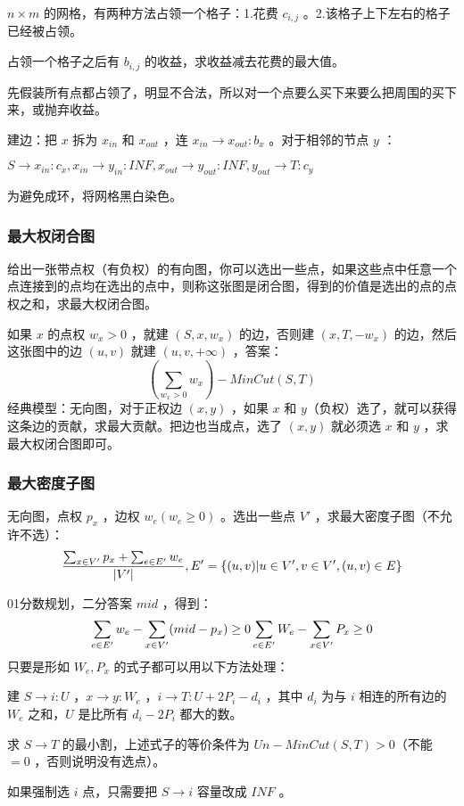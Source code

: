 $n\times m$ 的网格，有两种方法占领一个格子：1.花费 $c_{i,j}$ 。2.该格子上下左右的格子已经被占领。

占领一个格子之后有 $b_{i,j}$ 的收益，求收益减去花费的最大值。

先假装所有点都占领了，明显不合法，所以对一个点要么买下来要么把周围的买下来，或抛弃收益。

建边：把 $x$ 拆为 $x_{in}$ 和 $x_{out}$ ，连 $x_{in}\to x_{out}:b_x$ 。对于相邻的节点 $y$ ：

$S\to x_{in}:c_x,x_{in}\to y_{in}:INF,x_{out}\to y_{out}:INF,y_{out}\to T:c_y$

为避免成环，将网格黑白染色。

\subsubsection{最大权闭合图}

给出一张带点权（有负权）的有向图，你可以选出一些点，如果这些点中任意一个点连接到的点均在选出的点中，则称这张图是闭合图，得到的价值是选出的点的点权之和，求最大权闭合图。

如果 $x$ 的点权 $w_x>0$ ，就建 $(S,x,w_x)$ 的边，否则建 $(x,T,-w_x)$ 的边，然后这张图中的边 $(u,v)$ 就建 $(u,v,+\infty)$ ，答案：
$$
(\sum_{w_x>0}w_x)-MinCut(S,T)
$$
经典模型：无向图，对于正权边 $(x,y)$ ，如果 $x$ 和 $y$（负权）选了，就可以获得这条边的贡献，求最大贡献。把边也当成点，选了 $(x,y)$ 就必须选 $x$ 和 $y$ ，求最大权闭合图即可。

\subsubsection{最大密度子图}

无向图，点权 $p_x$ ，边权 $w_e(w_e\ge 0)$ 。选出一些点 $V'$ ，求最大密度子图（不允许不选）：
$$
{\sum_{x\in V'}p_x+\sum_{e\in E'}w_e\over|V'|},E'=\{(u,v)|u\in V',v\in V',(u,v)\in E\}
$$

01分数规划，二分答案 $mid$ ，得到：
$$
\sum_{e\in E'}w_e-\sum_{x\in V'}(mid-p_x)\ge 0\\
\sum_{e\in E'}W_e-\sum_{x\in V'}P_x\ge 0
$$
只要是形如 $W_e,P_x$ 的式子都可以用以下方法处理：

建 $S\to i:U$ ，$x\to y:W_e$ ，$i\to T:U+2P_i-d_i$ ，其中 $d_i$ 为与 $i$ 相连的所有边的 $W_e$ 之和，$U$ 是比所有 $d_i-2P_i$ 都大的数。

求 $S\to T$ 的最小割，上述式子的等价条件为 $Un-MinCut(S,T)>0$（不能 $=0$ ，否则说明没有选点）。

如果强制选 $i$ 点，只需要把 $S\to i$ 容量改成 $INF$ 。

